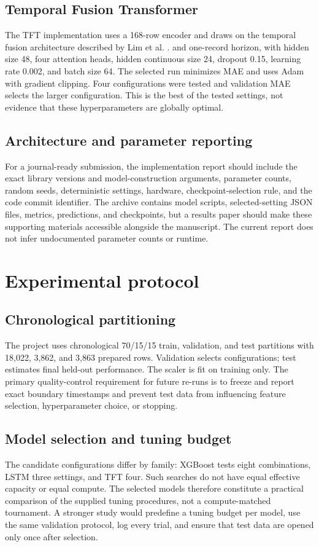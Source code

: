 \documentclass[12pt,a4paper]{article}
\begin{document}
\subsection{Temporal Fusion Transformer}
The TFT implementation uses a 168-row encoder and draws on the temporal fusion architecture described by Lim et al. \cite{tft}. and one-record horizon, with hidden size 48, four attention heads, hidden continuous size 24, dropout 0.15, learning rate 0.002, and batch size 64. The selected run minimizes MAE and uses Adam with gradient clipping. Four configurations were tested and validation MAE selects the larger configuration. This is the best of the tested settings, not evidence that these hyperparameters are globally optimal.

\subsection{Architecture and parameter reporting}
For a journal-ready submission, the implementation report should include the exact library versions and model-construction arguments, parameter counts, random seeds, deterministic settings, hardware, checkpoint-selection rule, and the code commit identifier. The archive contains model scripts, selected-setting JSON files, metrics, predictions, and checkpoints, but a results paper should make these supporting materials accessible alongside the manuscript. The current report does not infer undocumented parameter counts or runtime.

\newpage
\section{Experimental protocol}
\subsection{Chronological partitioning}
The project uses chronological 70/15/15 train, validation, and test partitions with 18,022, 3,862, and 3,863 prepared rows. Validation selects configurations; test estimates final held-out performance. The scaler is fit on training only. The primary quality-control requirement for future re-runs is to freeze and report exact boundary timestamps and prevent test data from influencing feature selection, hyperparameter choice, or stopping.

\subsection{Model selection and tuning budget}
The candidate configurations differ by family: XGBoost tests eight combinations, LSTM three settings, and TFT four. Such searches do not have equal effective capacity or equal compute. The selected models therefore constitute a practical comparison of the supplied tuning procedures, not a compute-matched tournament. A stronger study would predefine a tuning budget per model, use the same validation protocol, log every trial, and ensure that test data are opened only once after selection.
\end{document}
